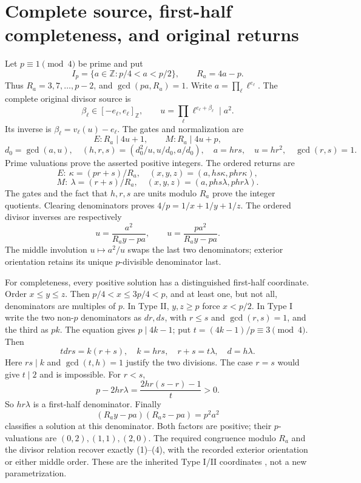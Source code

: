 \section{Complete source, first-half completeness, and original returns}
Let $p\equiv1\pmod4$ be prime and put
\[
 I_p=\{a\in\mathbb Z:p/4<a<p/2\},\qquad R_a=4a-p.
\]
Thus $R_a=3,7,\ldots,p-2$, and $\gcd(pa,R_a)=1$.
Write $a=\prod_\ell\ell^{e_\ell}$. The complete original divisor source is
\[
 \beta_\ell\in[-e_\ell,e_\ell]_{\mathbb Z},\qquad
 u=\prod_\ell\ell^{e_\ell+\beta_\ell}\mid a^2.            \tag{1}
\]
Its inverse is $\beta_\ell=v_\ell(u)-e_\ell$. The gates and normalization are
\[
 E:R_a\mid4u+1,\qquad M:R_a\mid4u+p,
\]
\[
 d_0=\gcd(a,u),\quad (h,r,s)=(d_0^2/u,u/d_0,a/d_0),
 \quad a=hrs,\quad u=hr^2,\quad\gcd(r,s)=1.
\]
Prime valuations prove the asserted positive integers. The ordered returns are
\[
 E:\ \kappa=(pr+s)/R_a,\quad(x,y,z)=(a,hs\kappa,phr\kappa),
                                                               \tag{2}
\]
\[
 M:\ \lambda=(r+s)/R_a,\quad(x,y,z)=(a,phs\lambda,phr\lambda).
                                                               \tag{3}
\]
The gates and the fact that $h,r,s$ are units modulo $R_a$ prove the integer
quotients. Clearing denominators proves $4/p=1/x+1/y+1/z$. The ordered divisor
inverses are respectively
\[
 u=\frac{a^2}{R_ay-pa},\qquad
 u=\frac{pa^2}{R_ay-pa}.                                      \tag{4}
\]
The middle involution $u\mapsto a^2/u$ swaps the last two denominators;
exterior orientation retains its unique $p$-divisible denominator last.

For completeness, every positive solution has a distinguished first-half
coordinate. Order $x\le y\le z$. Then $p/4<x\le3p/4<p$, and at least one,
but not all, denominators are multiples of $p$. In Type II, $y,z\ge p$ force
$x<p/2$. In Type I write the two non-$p$ denominators as $dr,ds$, with
$r\le s$ and $\gcd(r,s)=1$, and the third as $pk$. The equation gives
$p\mid4k-1$; put $t=(4k-1)/p\equiv3\pmod4$. Then
\[
 td rs=k(r+s),\quad k=h rs,\quad r+s=t\lambda,\quad d=h\lambda.
\]
Here $rs\mid k$ and $\gcd(t,h)=1$ justify the two divisions.
The case $r=s$ would give $t\mid2$ and is impossible. For $r<s$,
\[
 p-2hr\lambda
 =\frac{2hr(s-r)-1}{t}>0.
\]
So $hr\lambda$ is a first-half denominator. Finally
\[
 (R_ay-pa)(R_az-pa)=p^2a^2                                 \tag{5}
\]
classifies a solution at this denominator. Both factors are positive; their
$p$-valuations are $(0,2),(1,1),(2,0)$. The required congruence modulo $R_a$
and the divisor relation recover exactly (1)--(4), with the recorded exterior
orientation or either middle order. These are the inherited Type I/II
coordinates \cite[Propositions 2.2 and 2.6]{ET}, not a new parametrization.

